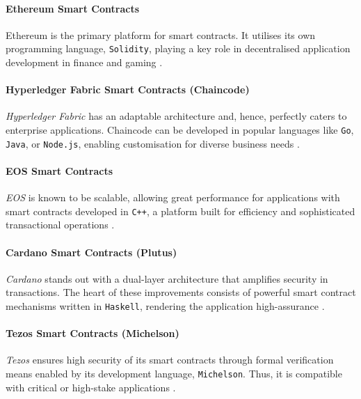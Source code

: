 \paragraph{Ethereum Smart Contracts}

Ethereum is the primary platform for smart contracts. It utilises its own programming language, \texttt{Solidity}, playing a key role in decentralised application development in finance and gaming \cite{Buterin2014, KushwahaEtAl2022, ZhouEtAl2022}.

\paragraph{Hyperledger Fabric Smart Contracts (Chaincode)}

\textit{Hyperledger Fabric} has an adaptable architecture and, hence, perfectly caters to enterprise applications. Chaincode can be developed in popular languages like \texttt{Go}, \texttt{Java}, or \texttt{Node.js}, enabling customisation for diverse business needs \cite{ZandEtAl2021}. 

\paragraph{EOS Smart Contracts}

\textit{EOS} is known to be scalable, allowing great performance for applications with smart contracts developed in \texttt{C++}, a platform built for efficiency and sophisticated transactional operations \cite{Elrom2019}.

\paragraph{Cardano Smart Contracts (Plutus)}

\textit{Cardano} stands out with a dual-layer architecture that amplifies security in transactions. The heart of these improvements consists of powerful smart contract mechanisms written in \texttt{Haskell}, rendering the application high-assurance \cite{BartolettiEtAl2024, OrozcoEtAl2022}.

\paragraph{Tezos Smart Contracts (Michelson)}

\textit{Tezos} ensures high security of its smart contracts through formal verification means enabled by its development language, \texttt{Michelson}. Thus, it is compatible with critical or high-stake applications \cite{NishidaEtAl20}.

